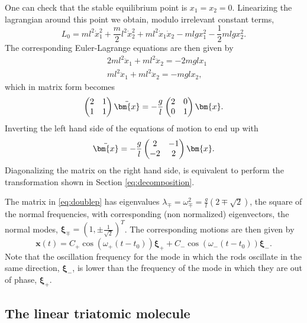 \documentclass[english,fontsize=11pt,paper=a5,oneside]{scrbook}
\newcommand{\bx}{\bm{x}}
\theoremstyle{definition}
\begin{document}
One can check that the stable equilibrium point is $x_1 = x_2 = 0$.
Linearizing the lagrangian around this point we obtain, modulo irrelevant constant terms,
\begin{equation}
  L_0 = m l^2 \dot x_1^2
  + \frac m2 l^2 \dot x_2^2
  + m l^2 \dot x_1 \dot x_2
  - ml g x_1^2
  - \frac12 mlg x_2^2.
\end{equation}
The corresponding Euler-Lagrange equations are then given by
\begin{align}
   & 2ml^2 \ddot x_1 + ml^2 \ddot x_2 = -2mgl x_1 \\
   & ml^2 \ddot x_1 + ml^2 \ddot x_2 = -mgl x_2,
\end{align}
which in matrix form becomes
\begin{equation}
  \begin{pmatrix}2&1\\1&1\end{pmatrix} \ddot\bx
  = - \frac gl \begin{pmatrix}2&0\\0&1\end{pmatrix} \bx.
\end{equation}
Inverting the left hand side of the equations of motion to end up with
\begin{equation}\label{eq:doublep}
  \ddot \bx = - \frac gl \begin{pmatrix}2&-1\\-2&2\end{pmatrix} \bx.
\end{equation}
Diagonalizing the matrix on the right hand side, is equivalent to perform the transformation shown in Section \ref{eq:decomposition}.

The matrix in \eqref{eq:doublep} has eigenvalues $\lambda_\mp = \omega_\mp^2 = \frac{g}l \left(2\mp \sqrt{2}\right)$, the square of the normal frequencies, with corresponding (non normalized) eigenvectors, the normal modes, $\bm{\xi}_\mp = \left(1, \pm \frac1{\sqrt{2}}\right)^T$.
The corresponding motions are then given by
\begin{equation}
  \bx(t) = C_+  \cos (\omega_+ (t - t_0)) \bm{\xi}_+ + C_- \cos (\omega_- (t - t_0)) \bm{\xi}_-.
\end{equation}
Note that the oscillation frequency for the mode in which the rods oscillate in the same direction, $\bm{\xi}_-$, is lower than the frequency of the mode in which they are out of phase, $\bm{\xi}_+$.

\subsection{The linear triatomic molecule}\label{sec:triatomic}
\end{document}
